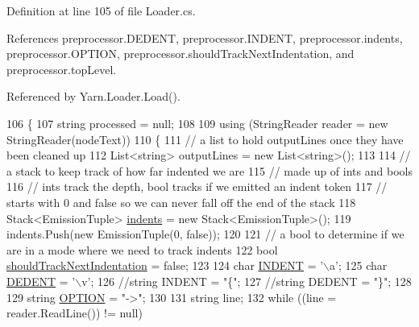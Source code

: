 Definition at line 105 of file Loader.\-cs.



References preprocessor.\-D\-E\-D\-E\-N\-T, preprocessor.\-I\-N\-D\-E\-N\-T, preprocessor.\-indents, preprocessor.\-O\-P\-T\-I\-O\-N, preprocessor.\-should\-Track\-Next\-Indentation, and preprocessor.\-top\-Level.



Referenced by Yarn.\-Loader.\-Load().


\begin{DoxyCode}
106         \{
107             \textcolor{keywordtype}{string} processed = null;
108 
109             \textcolor{keyword}{using} (StringReader reader = \textcolor{keyword}{new} StringReader(nodeText))
110             \{
111                 \textcolor{comment}{// a list to hold outputLines once they have been cleaned up}
112                 List<string> outputLines = \textcolor{keyword}{new} List<string>();
113 
114                 \textcolor{comment}{// a stack to keep track of how far indented we are}
115                 \textcolor{comment}{// made up of ints and bools}
116                 \textcolor{comment}{// ints track the depth, bool tracks if we emitted an indent token}
117                 \textcolor{comment}{// starts with 0 and false so we can never fall off the end of the stack}
118                 Stack<EmissionTuple> \hyperlink{a00330_a00fba9ee9674b2513dbe28eab795b734}{indents} = \textcolor{keyword}{new} Stack<EmissionTuple>();
119                 indents.Push(\textcolor{keyword}{new} EmissionTuple(0, \textcolor{keyword}{false}));
120 
121                 \textcolor{comment}{// a bool to determine if we are in a mode where we need to track indents}
122                 \textcolor{keywordtype}{bool} \hyperlink{a00330_afa485f45ab87bc0f06c1dfc46737c057}{shouldTrackNextIndentation} = \textcolor{keyword}{false};
123 
124                 \textcolor{keywordtype}{char} \hyperlink{a00330_ae3f2190a793ab77428838e58e0e83676}{INDENT} = \textcolor{charliteral}{'\(\backslash\)a'};
125                 \textcolor{keywordtype}{char} \hyperlink{a00330_a83653c3e52fa74614e655a91ad2b7181}{DEDENT} = \textcolor{charliteral}{'\(\backslash\)v'};
126                 \textcolor{comment}{//string INDENT = "\{";}
127                 \textcolor{comment}{//string DEDENT = "\}";}
128 
129                 \textcolor{keywordtype}{string} \hyperlink{a00330_a7ca2dc5371587b21476669a45af013cd}{OPTION} = \textcolor{stringliteral}{"->"};
130 
131                 \textcolor{keywordtype}{string} line;
132                 \textcolor{keywordflow}{while} ((line = reader.ReadLine()) != null)

\end{DoxyCode}
